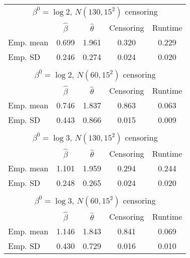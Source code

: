 \documentclass[english]{article}
\providecommand{\tabularnewline}{\\}
\begin{document}
\begin{table}
{\protect\centering{}%
\begin{tabular}{l|c|c|c|c|}
\multicolumn{5}{c}{$\beta^{0}=\log2$, $N(130,15^{2})$ censoring}\tabularnewline
\cline{2-5} 
 & $\hat{\beta}$ & $\hat{\theta}$ & Censoring & Runtime\tabularnewline
\hline 
\multicolumn{1}{|l|}{Emp. mean} & 0.699 & 1.961 & 0.320 & 0.229\tabularnewline
\hline 
\multicolumn{1}{|l|}{Emp. SD} & 0.246 & 0.274 & 0.024 & 0.020\tabularnewline
\hline 
\multicolumn{1}{l}{} & \multicolumn{1}{c}{} & \multicolumn{1}{c}{} & \multicolumn{1}{c}{} & \multicolumn{1}{c}{}\tabularnewline
\multicolumn{5}{c}{$\beta^{0}=\log2$, $N(60,15^{2})$ censoring}\tabularnewline
\cline{2-5} 
 & $\hat{\beta}$ & $\hat{\theta}$ & Censoring & Runtime\tabularnewline
\hline 
\multicolumn{1}{|l|}{Emp. mean} & 0.746 & 1.837 & 0.863 & 0.063\tabularnewline
\hline 
\multicolumn{1}{|l|}{Emp. SD} & 0.443 & 0.866 & 0.015 & 0.009\tabularnewline
\hline 
\multicolumn{1}{l}{} & \multicolumn{1}{c}{} & \multicolumn{1}{c}{} & \multicolumn{1}{c}{} & \multicolumn{1}{c}{}\tabularnewline
\multicolumn{5}{c}{$\beta^{0}=\log3$, $N(130,15^{2})$ censoring}\tabularnewline
\cline{2-5} 
 & $\hat{\beta}$ & $\hat{\theta}$ & Censoring & Runtime\tabularnewline
\hline 
\multicolumn{1}{|l|}{Emp. mean} & 1.101 & 1.959 & 0.294 & 0.244\tabularnewline
\hline 
\multicolumn{1}{|l|}{Emp. SD} & 0.248 & 0.265 & 0.024 & 0.020\tabularnewline
\hline 
\multicolumn{1}{l}{} & \multicolumn{1}{c}{} & \multicolumn{1}{c}{} & \multicolumn{1}{c}{} & \multicolumn{1}{c}{}\tabularnewline
\multicolumn{5}{c}{$\beta^{0}=\log3$, $N(60,15^{2})$ censoring}\tabularnewline
\cline{2-5} 
 & $\hat{\beta}$ & $\hat{\theta}$ & Censoring & Runtime\tabularnewline
\hline 
\multicolumn{1}{|l|}{Emp. mean} & 1.146 & 1.843 & 0.841 & 0.069\tabularnewline
\hline 
\multicolumn{1}{|l|}{Emp. SD} & 0.430 & 0.729 & 0.016 & 0.010\tabularnewline
\hline 
\end{tabular}\protect}\hfill{}
\end{table}
\end{document}
